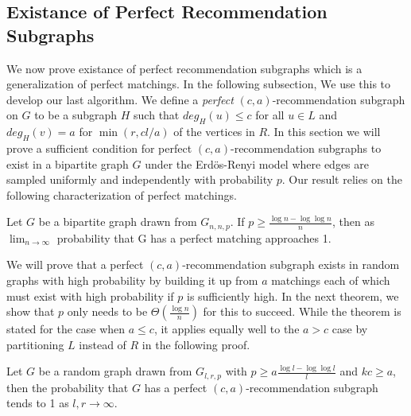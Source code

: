 \subsection{Existance of Perfect Recommendation Subgraphs}
We now prove existance of perfect recommendation subgraphs which is a generalization
of perfect matchings. In the following subsection, We use this to develop our last algorithm.
We define a \emph{perfect} $(c,a)$-recommendation subgraph on $G$ to be a subgraph $H$ such that
$deg_H(u)\leq c$ for all $u\in L$ and $deg_H(v)=a$ for
$\min(r,cl/a)$ of the vertices in $R$. In this section we will
prove a sufficient condition for perfect $(c,a)$-recommendation
subgraphs to exist in a bipartite graph $G$ under the Erd\"os-Renyi model\cite{ErdosRenyi59} where edges are sampled
uniformly and independently with probability $p$. Our result relies on
the following characterization of perfect matchings.

\begin{thm}\cite{Janson2011}
\label{random_matching_threshold}
Let $G$ be a bipartite graph drawn from $G_{n, n, p}$. If $p \geq \frac{\log n -
\log\log n}{n}$, then as $\lim_{n\to\infty}$ probability that G has a perfect
    matching approaches 1.
\end{thm}

We will prove that a perfect $(c,a)$-recommendation subgraph exists in
random graphs with high probability by building it up from $a$
matchings each of which must exist with high probability if $p$ is
sufficiently high. In the next theorem, we show that $p$ only needs to
be $\Theta(\frac{\log n}{n})$ for this to succeed. While the theorem is stated for
the case when $a \leq c$, it applies equally well to the $a > c$
case by partitioning $L$ instead of $R$ in the following proof.

\begin{thm}
Let $G$ be a random graph drawn from $G_{l, r, p}$ with $p\geq a\frac{\log l-\log\log
l}{l}$ and $kc \geq a$, then the probability that $G$ has a perfect $(c, a)$-recommendation
subgraph tends to 1 as $l,r\to\infty$.
\end{thm}

